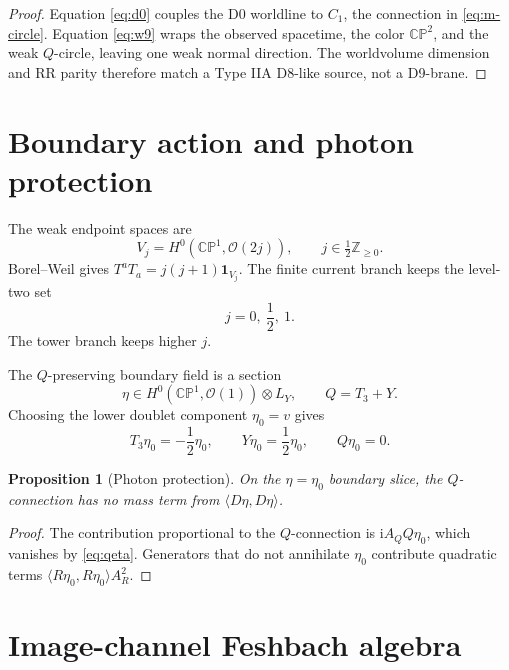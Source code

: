 \documentclass[11pt]{article}
\newcommand{\CP}{\mathbb{CP}}
\newcommand{\OO}{\mathcal{O}}
\newcommand{\ii}{\mathrm{i}}
\theoremstyle{plain}
\newtheorem{proposition}{Proposition}[section]
\theoremstyle{definition}
\begin{document}
\begin{proof}
Equation \eqref{eq:d0} couples the D0 worldline to \(C_1\), the connection in
\eqref{eq:m-circle}.  Equation \eqref{eq:w9} wraps the observed spacetime,
the color \(\CP^2\), and the weak \(Q\)-circle, leaving one weak normal
direction.  The worldvolume dimension and RR parity
therefore match a Type IIA D8-like source, not a D9-brane.
\end{proof}

\section{Boundary action and photon protection}

The weak endpoint spaces are
\begin{equation}
  V_j=H^0(\CP^1,\OO(2j)),\qquad j\in \tfrac12\mathbb Z_{\ge0}.
  \label{eq:vj}
\end{equation}
Borel--Weil gives \(T^aT_a=j(j+1)\mathbf 1_{V_j}\).  The finite current branch
keeps the level-two set
\begin{equation}
  j=0,\ \frac12,\ 1.
  \label{eq:level-two}
\end{equation}
The tower branch keeps higher \(j\).

The \(Q\)-preserving boundary field is a section
\begin{equation}
  \eta\in H^0(\CP^1,\OO(1))\otimes L_Y,
  \qquad Q=T_3+Y.
  \label{eq:eta}
\end{equation}
Choosing the lower doublet component \(\eta_0=v\) gives
\begin{equation}
  T_3\eta_0=-\frac12\eta_0,\qquad
  Y\eta_0=\frac12\eta_0,\qquad
  Q\eta_0=0.
  \label{eq:qeta}
\end{equation}

\begin{proposition}[Photon protection]
On the \(\eta=\eta_0\) boundary slice, the \(Q\)-connection has no mass term
from \(\langle D\eta,D\eta\rangle\).
\end{proposition}

\begin{proof}
The contribution proportional to the \(Q\)-connection is
\(\ii A_QQ\eta_0\), which vanishes by \eqref{eq:qeta}.  Generators that do not
annihilate \(\eta_0\) contribute quadratic terms
\(\langle R\eta_0,R\eta_0\rangle A_R^2\).
\end{proof}

\section{Image-channel Feshbach algebra}
\end{document}
